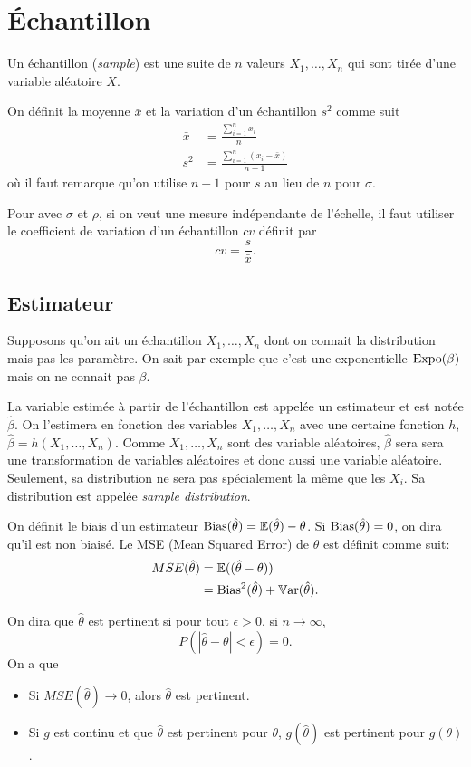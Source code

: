 \section{Échantillon}
Un échantillon (\emph{sample}) est une suite de $n$ valeurs $X_1, \ldots, X_n$ qui sont tirée d'une variable aléatoire $X$.

On définit la moyenne $\bar{x}$ et la variation d'un échantillon $s^2$ comme suit
\begin{align*}
  \bar{x} & = \frac{\sum_{i=1}^n x_i}{n}\\
  s^2 & = \frac{\sum_{i=1}^n (x_i - \bar{x})}{n-1}
\end{align*}
où il faut remarque qu'on utilise $n-1$ pour $s$ au lieu de $n$ pour $\sigma$.

Pour avec $\sigma$ et $\rho$, si on veut une mesure indépendante de l'échelle,
il faut utiliser le coefficient de variation d'un échantillon $cv$ définit par
\[ cv = \frac{s}{\bar{x}}. \]

\subsection{Estimateur}
Supposons qu'on ait un échantillon $X_1, \ldots, X_n$ dont on connait
la distribution mais pas les paramètre.
On sait par exemple que c'est une exponentielle $\operatorname{Expo}(\beta)$ mais on ne connait pas $\beta$.

La variable estimée à partir de l'échantillon est appelée un estimateur et est notée $\hat{\beta}$.
On l'estimera en fonction des variables $X_1, \ldots, X_n$ avec une certaine fonction $h$,
$\hat{\beta} = h(X_1, \ldots, X_n)$.
Comme $X_1, \ldots, X_n$ sont des variable aléatoires,
$\hat{\beta}$ sera sera une transformation de variables aléatoires et donc aussi une variable aléatoire.
Seulement, sa distribution ne sera pas spécialement la même que les $X_i$.
Sa distribution est appelée \emph{sample distribution}.

On définit le biais d'un estimateur $\operatorname{Bias}(\hat{\theta}) = \mathbb{E}(\hat{\theta}) - \theta$.
Si $\operatorname{Bias}(\hat{\theta}) = 0$, on dira qu'il est non biaisé.
Le MSE (Mean Squared Error) de $\hat{\theta}$ est définit comme suit:
\begin{align*}
  MSE(\hat{\theta}) & = \mathbb{E}((\hat{\theta} - \theta))\\
                    & = \operatorname{Bias}^2(\hat{\theta}) + \operatorname{\mathbb{V}ar}(\hat{\theta}).
\end{align*}

On dira que $\hat{\theta}$ est pertinent si pour tout $\epsilon > 0$,
si $n \to \infty$,
\[ P(|\hat{\theta} - \theta| < \epsilon) = 0. \]
On a que
\begin{itemize}
  \item Si $MSE(\hat{\theta}) \to 0$, alors $\hat\theta$ est pertinent.
  \item Si $g$ est continu et que $\hat\theta$ est pertinent pour $\theta$,
    $g(\hat{\theta})$ est pertinent pour $g(\theta)$.
\end{itemize}

